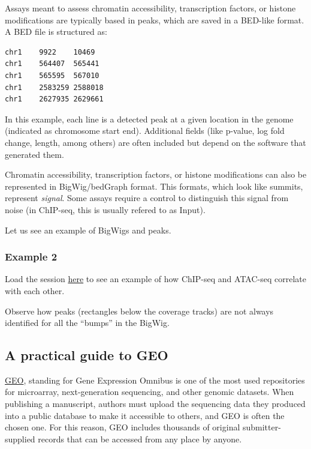 \documentclass[
]{book}
\begin{document}
Assays meant to assess chromatin accessibility, transcription factors, or histone modifications are typically based in peaks, which are saved in a BED-like format. A BED file is structured as:

\begin{verbatim}
chr1    9922    10469   
chr1    564407  565441  
chr1    565595  567010  
chr1    2583259 2588018 
chr1    2627935 2629661 
\end{verbatim}

In this example, each line is a detected peak at a given location in the genome (indicated as chromosome start end). Additional fields (like p-value, log fold change, length, among others) are often included but depend on the software that generated them.

Chromatin accessibility, transcription factors, or histone modifications can also be represented in BigWig/bedGraph format. This formats, which look like summits, represent \emph{signal}. Some assays require a control to distinguish this signal from noise (in ChIP-seq, this is usually refered to as Input).

Let us see an example of BigWigs and peaks.

\hypertarget{example-2}{%
\subsubsection{Example 2}\label{example-2}}

Load the session \href{IGV_sessions/ExampleATAC_ChIP_CTCF_hg38.json}{here} to see an example of how ChIP-seq and ATAC-seq correlate with each other.

Observe how peaks (rectangles below the coverage tracks) are not always identified for all the ``bumps'' in the BigWig.

\hypertarget{a-practical-guide-to-geo}{%
\subsection{A practical guide to GEO}\label{a-practical-guide-to-geo}}

\href{https://www.ncbi.nlm.nih.gov/gds/}{GEO}, standing for Gene Expression Omnibus is one of the most used repositories for microarray, next-generation sequencing, and other genomic datasets. When publishing a manuscript, authors must upload the sequencing data they produced into a public database to make it accessible to others, and GEO is often the chosen one. For this reason, GEO includes thousands of original submitter-supplied records that can be accessed from any place by anyone.
\end{document}
